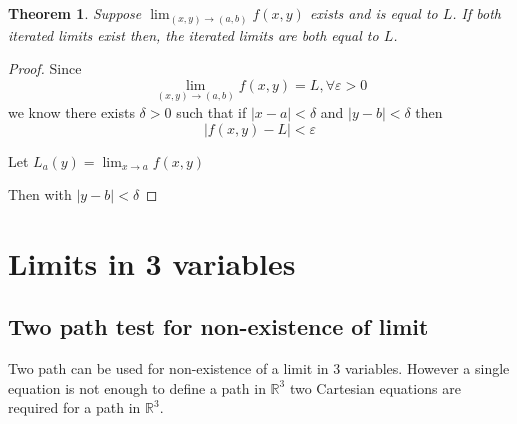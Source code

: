 \documentclass[oneside,11pt,pdftex]{book}%
\numberwithin{equation}{section}
\newtheorem{theorem}{Theorem}[chapter]%
\numberwithin{section}{chapter}
\numberwithin{equation}{chapter}
\newcommand{\R}{\mathbb{R}}
\begin{document}
\begin{theorem}
	Suppose $ \lim_{(x,y) \rightarrow (a,b)}f(x,y) $ exists and is equal to $ L $. If both iterated limits exist then, the iterated limits are both equal to $ L $.
\end{theorem}
\begin{proof}
	Since \[ \lim_{(x,y)\rightarrow (a,b)} f(x,y)=L, \forall \varepsilon>0\] we know there exists $ \delta>0 $ such that if $ |x-a|<\delta $ and $ |y-b| < \delta  $ then \[ |f(x,y)-L|<\varepsilon \]
	
	Let $ L_a(y)=\lim_{x\rightarrow a}f(x,y) $
	
	Then with $ |y-b|<\delta $
\end{proof}
%
%

\section{Limits in 3 variables}
\subsection{Two path test for non-existence of limit}
Two path can be used for non-existence of a limit in 3 variables. However a single equation is not enough to define a path in $ \R^3 $ two Cartesian equations are required for a path in $ \R^3 $.
\end{document}
